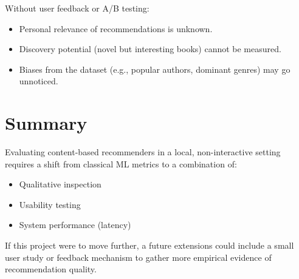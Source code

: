 Without user feedback or A/B testing:

\begin{itemize}
    \item Personal relevance of recommendations is unknown.
    \item Discovery potential (novel but interesting books) cannot be measured.
    \item Biases from the dataset (e.g., popular authors, dominant genres) may go unnoticed.
\end{itemize}

\section{Summary}
\label{sec:performance-summary}

Evaluating content-based recommenders in a local, non-interactive setting requires a shift from classical ML metrics to a combination of:

\begin{itemize}
    \item Qualitative inspection
    \item Usability testing
    \item System performance (latency)
\end{itemize}

If this project were to move further, a future extensions could include a small user study or feedback mechanism to gather more empirical evidence of recommendation quality.
